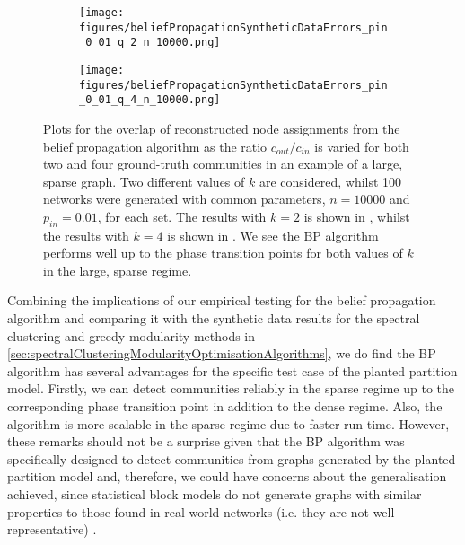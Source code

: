 \begin{figure}
\centering
	\begin{subfigure}{.5\textwidth}
		\centering
		\texttt{[image: figures/beliefPropagationSyntheticDataErrors\_pin\_0\_01\_q\_2\_n\_10000.png]}
		\caption{}
		\label{fig:BPAlgorithmResultsLargeNetwork_k_2}
	\end{subfigure}%
	\begin{subfigure}{.5\textwidth}
		\centering
		\texttt{[image: figures/beliefPropagationSyntheticDataErrors\_pin\_0\_01\_q\_4\_n\_10000.png]}
		\caption{}
		\label{fig:BPAlgorithmResultsLargeNetwork_k_4}
	\end{subfigure}
	\caption[Plot of overlap for belief propagation algorithm on large network for two and four ground-truth communities.]{\label{fig:BPAlgorithmResultsLargeNetwork} Plots for the overlap of reconstructed node assignments from the belief propagation algorithm as the ratio $c_{out}/c_{in}$ is varied for both two and four ground-truth communities in an example of a large, sparse graph. Two different values of $k$ are considered, whilst 100 networks were generated with common parameters, $n = 10000$ and $p_{in} = 0.01$, for each set. The results with $k = 2$ is shown in , whilst the results with $k = 4$ is shown in . We see the BP algorithm performs well up to the phase transition points for both values of $k$ in the large, sparse regime.}
\end{figure}

Combining the implications of our empirical testing for the belief propagation algorithm and comparing it with the synthetic data results for the spectral clustering and greedy modularity methods in \cref{sec:spectralClusteringModularityOptimisationAlgorithms}, we do find the BP algorithm has several advantages for the specific test case of the planted partition model.
Firstly, we can detect communities reliably in the sparse regime up to the corresponding phase transition point in addition to the dense regime.
Also, the algorithm is more scalable in the sparse regime due to faster run time.
However, these remarks should not be a surprise given that the BP algorithm was specifically designed to detect communities from graphs generated by the planted partition model and, therefore, we could have concerns about the generalisation achieved, since statistical block models do not generate graphs with similar properties to those found in real world networks (i.e. they are not well representative) \cite{DKM+13}.

